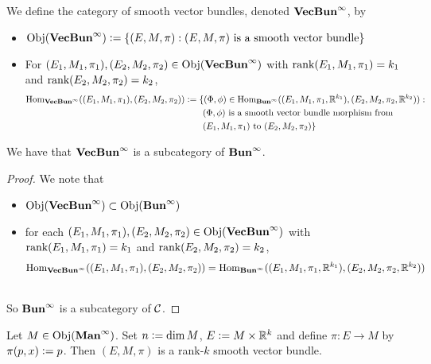 \documentclass{book}
\begin{document}
\begin{defn} 
	We define the category of smooth vector bundles, denoted $\VecBuninf$, by 
	\begin{itemize}
		\item $\Obj(\VecBuninf) \defeq \{(E, M, \pi): (E, M, \pi) \text{ is a smooth vector bundle}\}$
		\item For $(E_1, M_1, \pi_1), (E_2, M_2, \pi_2) \in \Obj(\VecBuninf)$ with $\rnk (E_1, M_1, \pi_1) = k_1$ and $\rnk (E_2, M_2, \pi_2) = k_2$,  
		\begin{align*}
			\Hom_{\VecBuninf}((E_1, M_1, \pi_1), (E_2, M_2, \pi_2)) 
			& \defeq \{ (\Phi, \phi) \in \Hom_{\Buninf}((E_1, M_1, \pi_1, \R^{k_1}), (E_2, M_2, \pi_2, \R^{k_2})): \\
			& \quad \quad \text{$(\Phi, \phi)$ is a smooth vector bundle morphism from} \\
			& \quad \quad \text{$(E_1, M_1, \pi_1)$ to $(E_2, M_2, \pi_2)$} \}
		\end{align*}
	\end{itemize}
\end{defn}

\begin{ex} 
	We have that $\VecBuninf$ is a subcategory of $\Buninf$.
\end{ex}

\begin{proof} We note that 
	\begin{itemize}
		\item $\Obj(\VecBuninf) \subset \Obj(\Buninf)$
		\item for each $(E_1, M_1, \pi_1), (E_2, M_2, \pi_2) \in \Obj(\VecBuninf)$ with $\rnk (E_1, M_1, \pi_1) = k_1$ and $\rnk (E_2, M_2, \pi_2) = k_2$, 
		$$\Hom_{\VecBuninf}((E_1, M_1, \pi_1), (E_2, M_2, \pi_2)) = \Hom_{\Buninf}((E_1, M_1, \pi_1, \R^{k_1}), (E_2, M_2, \pi_2, \R^{k_2}))$$
	\end{itemize}
\\
	So $\Buninf$ is a subcategory of $\MC$.
\end{proof}

\begin{ex} 
Let $M \in \Obj(\Maninf)$. Set $n \defeq \dim M$, $E \defeq M \times \R^k$ and define $\pi: E \rightarrow M$ by $\pi(p, x) \defeq p $. Then $(E, M, \pi)$ is a rank-$k$ smooth vector bundle.
\end{ex}
\end{document}
